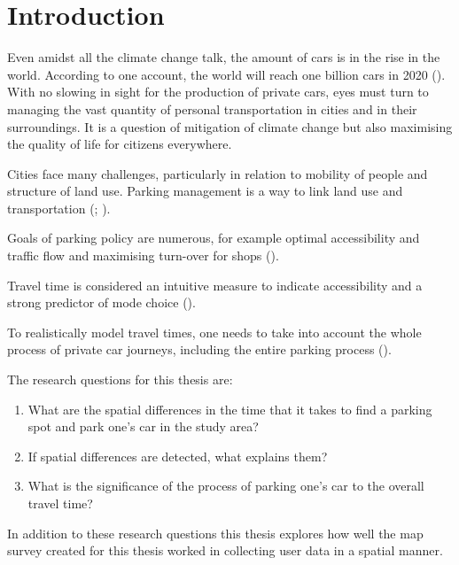 \section{Introduction}
\justify


Even amidst all the climate change talk, the amount of cars is in the rise in the world. According to one account, the world will reach one billion cars in 2020 (\cite{Sperling2009}). With no slowing in sight for the production of private cars, eyes must turn to managing the vast quantity of personal transportation in cities and in their surroundings. It is a question of mitigation of climate change but also maximising the quality of life for citizens everywhere.

Cities face many challenges, particularly in relation to mobility of people and structure of land use. Parking management is a way to link land use and transportation (\cite{Marsden2006TheReview}; \cite{Diallo2015MethodologyAnalysis}).

Goals of parking policy are numerous, for example optimal accessibility and traffic flow and maximising turn-over for shops (\cite{Marsden2006TheReview}). \par

Travel time is considered an intuitive measure to indicate accessibility and a strong predictor of mode choice (\cite{Frank2008UrbanChoice}).

To realistically model travel times, one needs to take into account the whole process of private car journeys, including the entire parking process (\cite{Salonen2013}).

\bigskip
\noindent
The research questions for this thesis are:

\begin{spacing}{1}
\begin{enumerate}[label=\Roman*] %
  \item What are the spatial differences in the time that it takes to find a parking spot and park one’s car in the study area?
  \item If spatial differences are detected, what explains them?
  \item What is the significance of the process of parking one’s car to the overall travel time?
\end{enumerate}
\end{spacing}
\bigskip
In addition to these research questions this thesis explores how well the map survey created for this thesis worked in collecting user data in a spatial manner.